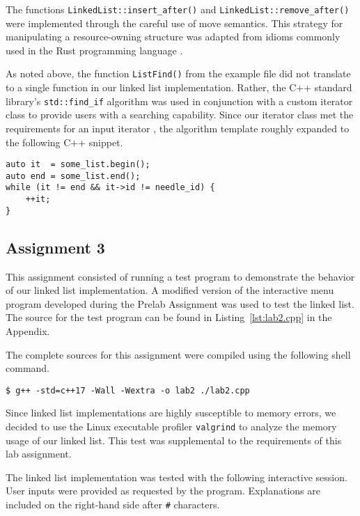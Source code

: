 \documentclass[11pt, letterpaper]{article} %
\begin{document}
The functions \texttt{LinkedList::insert\_after()} and \texttt{LinkedList::remove\_after()} were implemented through the careful use of move semantics. This strategy for manipulating a resource-owning structure was adapted from idioms commonly used in the Rust programming language \cite{rust-lang}.

As noted above, the function \texttt{ListFind()} from the example file did not translate to a single function in our linked list implementation. Rather, the C++ standard library's \texttt{std::find\_if} algorithm was used in conjunction with a custom iterator class to provide users with a searching capability. Since our iterator class met the requirements for an input iterator \cite[\S27.2.3]{open-std-N4659}, the algorithm template roughly expanded to the following C++ snippet.
\begin{lstlisting}[style=labreportstyle-c++]
auto it  = some_list.begin();
auto end = some_list.end();
while (it != end && it->id != needle_id) {
    ++it;
}
\end{lstlisting}



\subsection*{Assignment 3}\label{sec:assign-3}

This assignment consisted of running a test program to demonstrate the behavior of our linked list implementation. A modified version of the interactive menu program developed during the Prelab Assignment was used to test the linked list. The source for the test program can be found in Listing~\ref{lst:lab2.cpp} in the Appendix.

The complete sources for this assignment were compiled using the following shell command.
\begin{lstlisting}[style=labreportstyle-sh]
$ g++ -std=c++17 -Wall -Wextra -o lab2 ./lab2.cpp
\end{lstlisting}

Since linked list implementations are highly susceptible to memory errors, we decided to use the Linux executable profiler \texttt{valgrind} \cite{valgrind} to analyze the memory usage of our linked list. This test was supplemental to the requirements of this lab assignment. 

The linked list implementation was tested with the following interactive session. User inputs were provided as requested by the program. Explanations are included on the right-hand side after \texttt{\#} characters.
\end{document}
